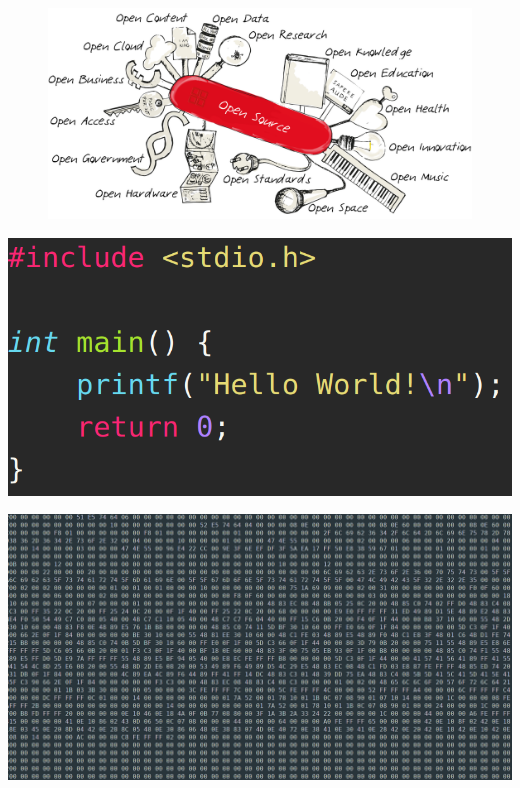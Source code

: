 \begin{frame}
	\begin{figure}
		\includegraphics[scale=1]{resources/open_swiss_knife.png}
	\end{figure}
\end{frame}

\begin{frame}
\centering\includegraphics[scale=0.5]{resources/hello_world_code.png}
\end{frame}

\begin{frame}
\centering\includegraphics[scale=0.3]{resources/hello_world_bin.png}
\end{frame}

